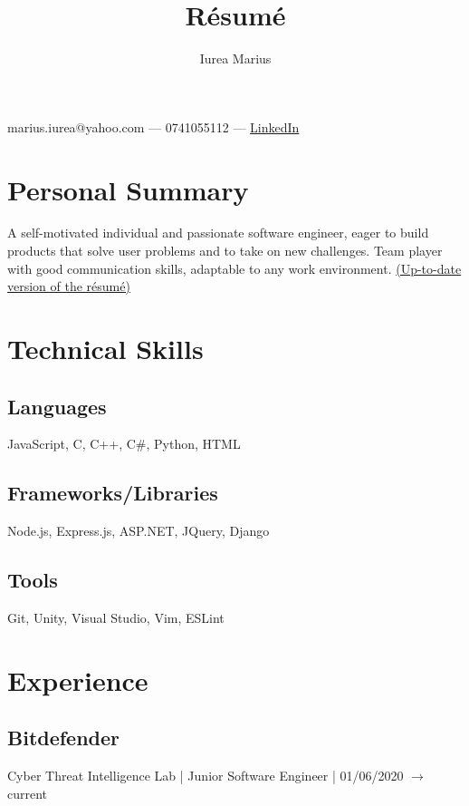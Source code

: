 \documentclass[a4paper,hidelinks,8pt]{article}
\begin{document}
\title{R\'esum\'e}
\author{Iurea Marius}
\renewcommand{\maketitle}
{
\begin{center}
        {\huge\bfseries
        \thetitle

        \theauthor}

        marius.iurea@yahoo.com --- 0741055112 --- \href{https://www.linkedin.com/in/marius-iurea-49b7021b5/}{LinkedIn}

        \end{center}
}

\maketitle

\section{Personal Summary}
A self-motivated individual and passionate software engineer, eager to build products that solve user problems and to take on new challenges.
Team player with good communication skills, adaptable to any work environment. \href{https://github.com/IureaMarius/Resume/blob/master/Resume.pdf}{(Up-to-date version of the r\'esum\'e)}
\section{Technical Skills}
\subsection{Languages}
JavaScript, C, C++, C\#, Python, HTML
\subsection{Frameworks/Libraries}
Node.js, Express.js, ASP.NET, JQuery, Django
\subsection{Tools}
Git, Unity, Visual Studio, Vim, ESLint
\section{Experience}
\subsection{Bitdefender}Cyber Threat Intelligence Lab | Junior Software Engineer | 01/06/2020 $\rightarrow$ current
\end{document}
